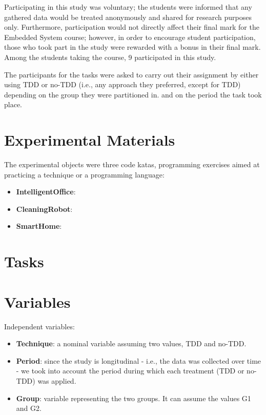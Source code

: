 Participating in this study was voluntary; the students were informed that any gathered data would be treated anonymously and shared for research purposes only. Furthermore, participation would not directly affect their final mark for the Embedded System course; however, in order to encourage student participation, those who took part in the study were rewarded with a bonus in their final mark. Among the students taking the course, 9 participated in this study.

The participants for the tasks were asked to carry out their assignment by either using TDD or no-TDD (i.e., any approach they preferred, except for TDD) depending on the group they were partitioned in. and on the period the task took place.



\section{Experimental Materials}
The experimental objects were three code katas, programming exercises aimed at practicing a technique or a programming language:
\begin{itemize}
    \item \textbf{IntelligentOffice}:
    \item \textbf{CleaningRobot}:
    \item \textbf{SmartHome}:
\end{itemize}



\section{Tasks}



\section{Variables}
Independent variables:
\begin{itemize}
    \item \textbf{Technique}: a nominal variable assuming two values, TDD and no-TDD.
    \item \textbf{Period}: since the study is longitudinal - i.e., the data was collected over time - we took into account the period during which each treatment (TDD or no-TDD) was applied.
    \item \textbf{Group}:  variable representing the two groups. It can assume the values G1 and G2.
\end{itemize}


